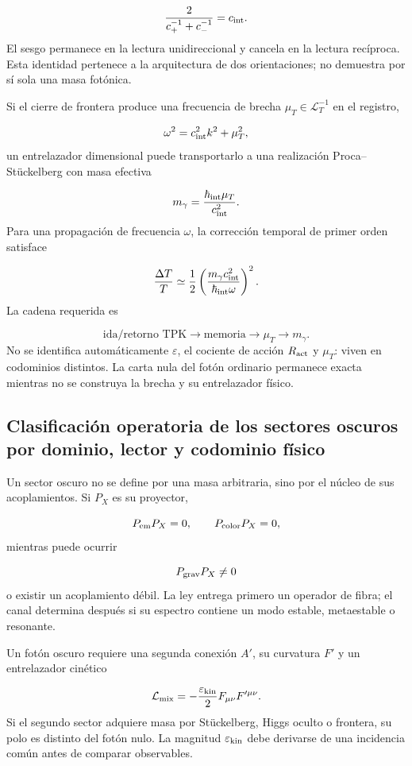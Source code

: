 \[
\frac{2}{c_+^{-1}+c_-^{-1}}=c_{\rm int}.
\]
El sesgo permanece en la lectura unidireccional y cancela en la lectura recíproca. Esta identidad pertenece a la arquitectura de dos orientaciones; no demuestra por sí sola una masa fotónica.

Si el cierre de frontera produce una frecuencia de brecha \(\mu_T\in\mathcal L_T^{-1}\) en el registro,

\[
\omega^2=c_{\rm int}^{2}k^2+\mu_T^2,
\]
un entrelazador dimensional puede transportarlo a una realización Proca--Stückelberg con masa efectiva

\[
m_\gamma=\frac{\hbar_{\rm int}\mu_T}{c_{\rm int}^{2}}.
\]
Para una propagación de frecuencia \(\omega\), la corrección temporal de primer orden satisface

\[
\frac{\Delta T}{T}
\simeq
\frac12
\left(
\frac{m_\gamma c_{\rm int}^{2}}
     {\hbar_{\rm int}\omega}
\right)^2.
\]
La cadena requerida es

\[
\text{ida/retorno TPK}
\longrightarrow
\text{memoria}
\longrightarrow
\mu_T
\longrightarrow
m_\gamma.
\]
No se identifica automáticamente \(\varepsilon\), el cociente de acción \(R_{\rm act}\) y \(\mu_T\): viven en codominios distintos. La carta nula del fotón ordinario permanece exacta mientras no se construya la brecha y su entrelazador físico.

\subsection{Clasificación operatoria de los sectores oscuros por dominio, lector y codominio físico}
Un sector oscuro no se define por una masa arbitraria, sino por el núcleo de sus acoplamientos. Si \(P_X\) es su proyector,

\[
P_{\rm em}P_X=0,
\qquad
P_{\rm color}P_X=0,
\]
mientras puede ocurrir

\[
P_{\rm grav}P_X\ne0
\]
o existir un acoplamiento débil. La ley entrega primero un operador de fibra; el canal determina después si su espectro contiene un modo estable, metaestable o resonante.

Un fotón oscuro requiere una segunda conexión \(A'\), su curvatura \(F'\) y un entrelazador cinético

\[
\mathcal L_{\rm mix}
=-\frac{\varepsilon_{\rm kin}}2F_{\mu\nu}F'^{\mu\nu}.
\]
Si el segundo sector adquiere masa por Stückelberg, Higgs oculto o frontera, su polo es distinto del fotón nulo. La magnitud \(\varepsilon_{\rm kin}\) debe derivarse de una incidencia común antes de comparar observables.

